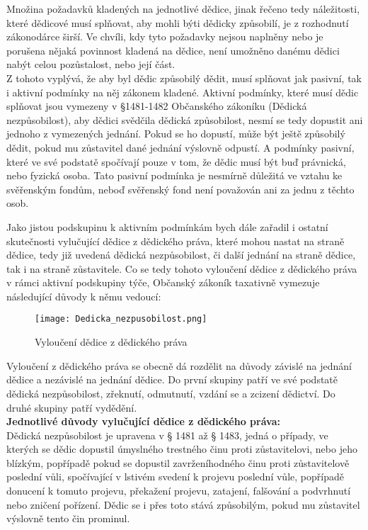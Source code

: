 \documentclass{article}
\begin{document}
Množina požadavků kladených na jednotlivé dědice, jinak řečeno tedy náležitosti, které dědicové musí splňovat, aby mohli býti dědicky způsobilí, je z rozhodnutí zákonodárce širší. Ve chvíli, kdy tyto požadavky nejsou naplněny nebo je porušena nějaká povinnost kladená na dědice, není umožněno danému dědici nabýt celou pozůstalost, nebo její část. \\

Z tohoto vyplývá, že aby byl dědic způsobilý dědit, musí splňovat jak pasivní, tak i aktivní podmínky na něj zákonem kladené. Aktivní podmínky, které musí dědic splňovat jsou vymezeny v §1481-1482 Občanského zákoníku (Dědická nezpůsobilost), aby dědici svědčila dědická způsobilost, nesmí se tedy dopustit ani jednoho z vymezených jednání. Pokud se ho dopustí, může být ještě způsobilý dědit, pokud mu zůstavitel dané jednání výslovně odpustí. A podmínky pasivní, které ve své podstatě spočívají pouze v tom, že dědic musí být buď právnická, nebo fyzická osoba. Tato pasivní podmínka je nesmírně důležitá ve vztahu ke svěřenským fondům, neboď svěřenský fond není považován ani za jednu z těchto osob.

\newpage

Jako jistou podskupinu k aktivním podmínkám bych dále zařadil i ostatní skutečnosti vylučující dědice z dědického práva, které mohou nastat na straně dědice, tedy již uvedená dědická nezpůsobilost, či další jednání na straně dědice, tak i na straně zůstavitele. Co se tedy tohoto vyloučení dědice z dědického práva v rámci aktivní podskupiny týče, Občanský zákoník taxativně vymezuje následující důvody k němu vedoucí:

\begin{figure}[h]
\centering
\texttt{[image: Dedicka\_nezpusobilost.png]}
\caption[Vyloučení dědice z dědického práva]{Vyloučení dědice z dědického práva}
\label{fig:komparace}
\end{figure}

Vyloučení z dědického práva se obecně dá rozdělit na důvody závislé na jednání dědice a nezávislé na jednání dědice. Do první skupiny patří ve své podstatě dědická nezpůsobilost, zřeknutí, odmutnutí, vzdání se a zcizení dědictví. Do druhé skupiny patří vydědění. \\

\noindent\textbf{Jednotlivé důvody vylučující dědice z dědického práva:} \\

Dědická nezpůsobilost je upravena v § 1481 až § 1483, jedná o případy, ve kterých se dědic dopustil úmyslného trestného činu proti zůstavitelovi, nebo jeho blízkým, popřípadě pokud se dopustil zavrženíhodného činu proti zůstavitelově poslední vůli, spočívající v lstivém svedení k projevu poslední vůle, popřípadě donucení k tomuto projevu, překažení projevu, zatajení, falšování a podvrhnutí nebo zničení pořízení. Dědic se i přes toto stává způsobilým, pokud mu zůstavitel výslovně tento čin prominul. \\
\end{document}
